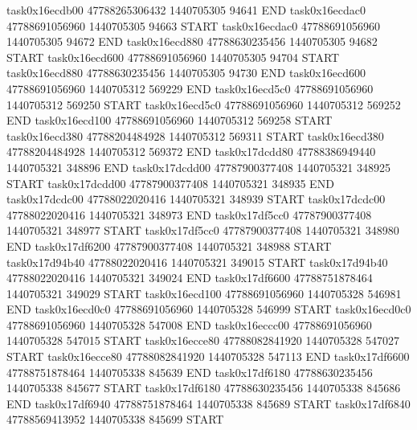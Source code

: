 task0x16ecdb00 47788265306432          1440705305                94641  END
task0x16ecdac0 47788691056960          1440705305                94663  START
task0x16ecdac0 47788691056960          1440705305                94672  END
task0x16ecd880 47788630235456          1440705305                94682  START
task0x16ecd600 47788691056960          1440705305                94704  START
task0x16ecd880 47788630235456          1440705305                94730  END
task0x16ecd600 47788691056960          1440705312               569229  END
task0x16ecd5c0 47788691056960          1440705312               569250  START
task0x16ecd5c0 47788691056960          1440705312               569252  END
task0x16ecd100 47788691056960          1440705312               569258  START
task0x16ecd380 47788204484928          1440705312               569311  START
task0x16ecd380 47788204484928          1440705312               569372  END
task0x17dcdd80 47788386949440          1440705321               348896  END
task0x17dcdd00 47787900377408          1440705321               348925  START
task0x17dcdd00 47787900377408          1440705321               348935  END
task0x17dcdc00 47788022020416          1440705321               348939  START
task0x17dcdc00 47788022020416          1440705321               348973  END
task0x17df5cc0 47787900377408          1440705321               348977  START
task0x17df5cc0 47787900377408          1440705321               348980  END
task0x17df6200 47787900377408          1440705321               348988  START
task0x17d94b40 47788022020416          1440705321               349015  START
task0x17d94b40 47788022020416          1440705321               349024  END
task0x17df6600 47788751878464          1440705321               349029  START
task0x16ecd100 47788691056960          1440705328               546981  END
task0x16ecd0c0 47788691056960          1440705328               546999  START
task0x16ecd0c0 47788691056960          1440705328               547008  END
task0x16eccc00 47788691056960          1440705328               547015  START
task0x16ecce80 47788082841920          1440705328               547027  START
task0x16ecce80 47788082841920          1440705328               547113  END
task0x17df6600 47788751878464          1440705338               845639  END
task0x17df6180 47788630235456          1440705338               845677  START
task0x17df6180 47788630235456          1440705338               845686  END
task0x17df6940 47788751878464          1440705338               845689  START
task0x17df6840 47788569413952          1440705338               845699  START
